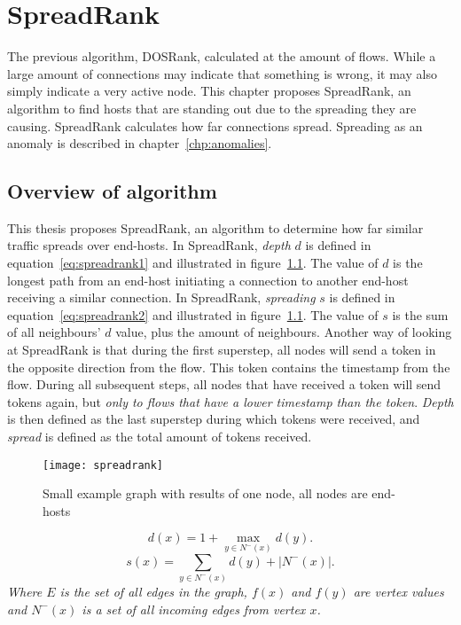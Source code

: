 \chapter{SpreadRank}
\label{chp:spreadrank}

The previous algorithm, DOSRank, calculated at the amount of flows.
While a large amount of connections may indicate that something is wrong,
 it may also simply indicate a very active node.
This chapter proposes SpreadRank, an algorithm to find hosts that are standing out due to the spreading they are causing.
SpreadRank calculates how far connections spread.
Spreading as an anomaly is described in chapter~\ref{chp:anomalies}.


\section{Overview of algorithm}
This thesis proposes SpreadRank, an algorithm to determine how far similar traffic spreads over end-hosts.
In SpreadRank, \emph{depth} $d$ is defined in equation~\ref{eq:spreadrank1} and illustrated in figure~\ref{fig:spreadrank}.
The value of $d$ is the longest path from an end-host initiating a connection to another end-host receiving a similar connection.
In SpreadRank, \emph{spreading} $s$ is defined in equation~\ref{eq:spreadrank2} and illustrated in figure~\ref{fig:spreadrank}.
The value of $s$ is the sum of all neighbours' $d$ value, plus the amount of neighbours.
Another way of looking at SpreadRank is that during the first superstep, all nodes will send a token in the opposite direction from the flow.
This token contains the timestamp from the flow.
During all subsequent steps, all nodes that have received a token will send tokens again, but \emph{only to flows that have a lower timestamp than the token}.
\emph{Depth} is then defined as the last superstep during which tokens were received, and \emph{spread} is defined as the total amount of tokens received.


\begin{figure}[h!]
	\caption{Small example graph with results of one node, all nodes are end-hosts}
	\label{fig:spreadrank}
	\centering
		\texttt{[image: spreadrank]}
\end{figure}
\begin{equation}
	\label{eq:spreadrank1}
	d(x) = 1 + \max_{y \in N^{-}(x)} d(y).
\end{equation}
\begin{equation}
	\label{eq:spreadrank2}
	\displaystyle s(x) = \sum_{y \in N^{-}(x)} d(y) + \left\vert{N^{-}(x)}\right\vert.
\end{equation}
\emph{Where $E$ is the set of all edges in the graph, $f(x)$ and $f(y)$ are vertex values and $N^{-}(x)$ is a set of all incoming edges from vertex $x$.}



